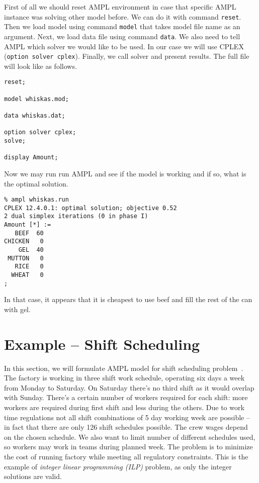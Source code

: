First of all we should reset AMPL environment in case that specific AMPL instance was solving other model before. We can do it with command \texttt{reset}. Then we load model using command \texttt{model} that takes model file name as an argument. Next, we load data file using command \texttt{data}. We also need to tell AMPL which solver we would like to be used. In our case we will use CPLEX (\texttt{option solver cplex}). Finally, we call solver and present results. The full file will look like as follows.

\begin{lstlisting}
reset;

model whiskas.mod;

data whiskas.dat;

option solver cplex;
solve;

display Amount;
\end{lstlisting}

Now we may run run AMPL and see if the model is working and if so, what is the optimal solution.

\begin{lstlisting}
% ampl whiskas.run
CPLEX 12.4.0.1: optimal solution; objective 0.52
2 dual simplex iterations (0 in phase I)
Amount [*] :=
   BEEF  60
CHICKEN   0
    GEL  40
 MUTTON   0
   RICE   0
  WHEAT   0
;
\end{lstlisting}

In that case, it appears that it is cheapest to use beef and fill the rest of the can with gel.

\section{Example -- Shift Scheduling}
\label{sec:ampl:sched}

In this section, we will formulate AMPL model for shift scheduling problem~\cite{Fourer2002}. The factory is working in three shift work schedule, operating six days a week from Monday to Saturday. On Saturday there's no third shift as it would overlap with Sunday. There's a certain number of workers required for each shift: more workers are required during first shift and less during the others. Due to work time regulations not all shift combinations of 5 day working week are possible -- in fact that there are only 126 shift schedules possible. The crew wages depend on the chosen schedule. We also want to limit number of different schedules used, so workers may work in teams during planned week. The problem is to minimize the cost of running factory while meeting all regulatory constraints. This is the example of \emph{integer linear programming (ILP)} problem, as only the integer solutions are valid. 

